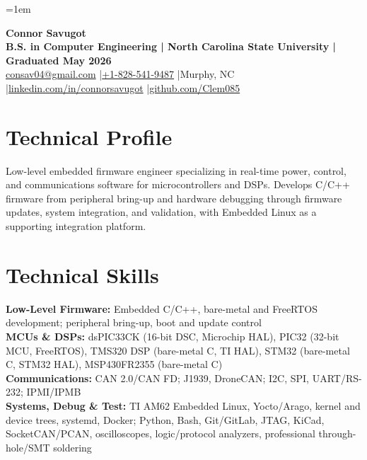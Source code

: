 \documentclass[10pt,letterpaper]{article}
\begin{document}
\fontsize{9.8}{10.72}\selectfont
\setlength{\RaggedRightRightskip}{0pt plus 5em}
\RaggedRight
\emergencystretch=1em

\begin{center}
  {\fontsize{21.5}{22.2}\selectfont\bfseries Connor Savugot}\\[1.5pt]
  {\bfseries B.S. in Computer Engineering | North Carolina State University | Graduated May 2026}\\[1.5pt]
  {\fontsize{9.6}{10.2}\selectfont
    \href{mailto:consav04@gmail.com}{consav04@gmail.com}
    \enspace|\enspace \href{tel:+18285419487}{+1-828-541-9487}
    \enspace|\enspace Murphy, NC
    \enspace|\enspace \href{https://linkedin.com/in/connorsavugot}{linkedin.com/in/connorsavugot}
    \enspace|\enspace \href{https://github.com/Clem085}{github.com/Clem085}}
\end{center}
\vspace{-0.18cm}

\section{Technical Profile}
Low-level embedded firmware engineer specializing in real-time power, control, and communications software for microcontrollers and DSPs. Develops C/C++ firmware from peripheral bring-up and hardware debugging through firmware updates, system integration, and validation, with Embedded Linux as a supporting integration platform.

\section{Technical Skills}
\textbf{Low-Level Firmware:} Embedded C/C++, bare-metal and FreeRTOS development; peripheral bring-up, boot and update control\\
\textbf{MCUs \& DSPs:} dsPIC33CK (16-bit DSC, Microchip HAL), PIC32 (32-bit MCU, FreeRTOS), TMS320 DSP (bare-metal C, TI HAL), STM32 (bare-metal C, STM32 HAL), MSP430FR2355 (bare-metal C)\\
\textbf{Communications:} CAN 2.0/CAN FD; J1939, DroneCAN; I2C, SPI, UART/RS-232; IPMI/IPMB\\
\textbf{Systems, Debug \& Test:} TI AM62 Embedded Linux, Yocto/Arago, kernel and device trees, systemd, Docker; Python, Bash, Git/GitLab, JTAG, KiCad, SocketCAN/PCAN, oscilloscopes, logic/protocol analyzers, professional through-hole/SMT soldering
\end{document}
